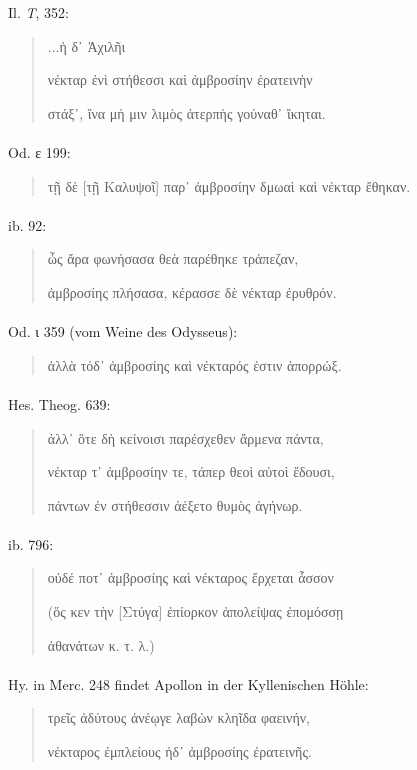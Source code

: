 \documentclass[a4paper, 11pt, oneside]{article}
\begin{document}
Il. \emph{T}, 352:
\begin{quotation}
...ἡ δ᾽ Ἀχιλῆι

νέκταρ ἐνὶ στήθεσσι καὶ ἀμβροσίην ἐρατεινὴν

στάξ᾽, ἵνα μή μιν λιμὸς ἀτερπὴς γούναθ᾽ ἴκηται.
\end{quotation}
\paragraph{}
Od. ε 199:
\begin{quotation}
τῇ δὲ [τῇ Καλυψοῖ] παρ᾽ ἀμβροσίην δμωαὶ καὶ νέκταρ ἔθηκαν.
\end{quotation}
\paragraph{}
ib. 92:
\begin{quotation}
ὧς ἄρα φωνήσασα θεὰ παρέθηκε τράπεζαν,

ἀμβροσίης πλήσασα, κέρασσε δὲ νέκταρ ἐρυθρόν.
\end{quotation}
\paragraph{}
Od. ι 359 (vom Weine des Odysseus):
\begin{quotation}
ἀλλὰ τόδ᾽ ἀμβροσίης καὶ νέκταρός ἐστιν ἀπορρώξ.
\end{quotation}
\paragraph{}
Hes. Theog. 639:
\begin{quotation}
ἀλλ᾽ ὅτε δὴ κείνοισι παρέσχεθεν ἄρμενα πάντα,

νέκταρ τ᾽ ἀμβροσίην τε, τάπερ θεοὶ αὐτοὶ ἔδουσι,

πάντων ἐν στήθεσσιν ἀέξετο θυμὸς ἀγήνωρ.
\end{quotation}
\paragraph{}
ib. 796:
\begin{quotation}
οὐδέ ποτ᾽ ἀμβροσίης καὶ νέκταρος ἔρχεται ἆσσον

(ὅς κεν τὴν [Στύγα] ἐπίορκον ἀπολείψας ἐπομόσσῃ

ἀθανάτων κ. τ. λ.)
\end{quotation}
\paragraph{}
Hy. in Merc. 248 findet Apollon in der Kyllenischen Höhle:
\begin{quotation}
τρεῖς ἀδύτους ἀνέῳγε λαβὼν κληῖδα φαεινήν,

νέκταρος ἐμπλείους ἠδ᾽ ἀμβροσίης ἐρατεινῆς.
\end{quotation}
\end{document}
